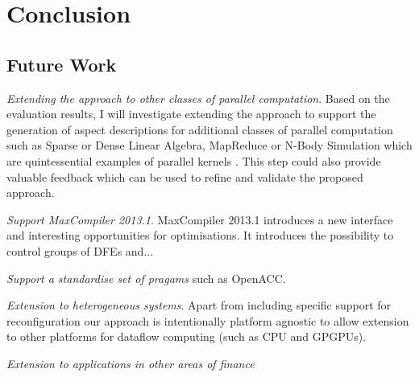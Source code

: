 \chapter{Conclusion}

\section{Future Work}

\emph{Extending the approach to other classes of parallel
  computation}.  Based on the evaluation results, I will investigate
extending the approach to support the generation of aspect
descriptions for additional classes of parallel computation such as
Sparse or Dense Linear Algebra, MapReduce or N-Body Simulation which
are quintessential examples of parallel kernels
\cite{Asanovic:Bodik:Catanzaro:Gebis:Husbands:Keutzer:Patterson:Plishker:Shalf:Williams:Yelick:2006}. This
step could also provide valuable feedback which can be used to refine
and validate the proposed approach.

\emph{Support MaxCompiler 2013.1}. MaxCompiler 2013.1 introduces a new
interface and interesting opportunities for optimisations. It
introduces the possibility to control groups of DFEs and...

\emph{Support a standardise set of pragams} such as OpenACC.

\emph{Extension to heterogeneous systems}. Apart from including
specific support for reconfiguration our approach is intentionally
platform agnostic to allow extension to other platforms for dataflow
computing (such as CPU and GPGPUs).

\emph{Extension to applications in other areas of finance}
